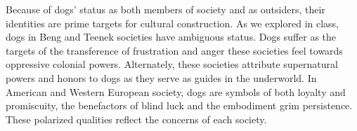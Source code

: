 \documentclass[12pt]{article}
\begin{document}
Because of dogs' status as both members of society and as outsiders, their
identities are prime targets for cultural construction. As we explored in class,
dogs in Beng and Teenek societies have ambiguous status. Dogs suffer as the
targets of the transference of frustration and anger these societies feel
towards oppressive colonial powers. Alternately, these societies attribute
supernatural powers and honors to dogs as they serve as guides in the
underworld. In American and Western European society, dogs are symbols of both
loyalty and promiscuity, the benefactors of blind luck and the embodiment grim
persistence. These polarized qualities reflect the concerns of each society.
\end{document}
